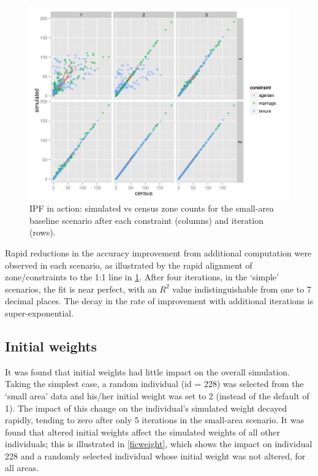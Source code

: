 \documentclass[a4paper,10pt]{article}
\begin{document}
\begin{figure}
 \begin{center}
  \includegraphics[width=12cm]{ipfinac}
 \end{center}
\caption{IPF in action: simulated vs census zone counts for the small-area baseline scenario after each constraint (columns) and iteration (rows).}
\label{fipfinac}
\end{figure}

Rapid reductions in the accuracy improvement from
additional computation were observed in each scenario, as illustrated
by the rapid alignment of zone/constraints to the 1:1 line in \cref{fipfinac}.
After four iterations, in the `simple' scenarios,
the fit is near perfect, with an $R^2$ value indistinguishable from one
to 7 decimal places. The decay in the rate of improvement with additional 
iterations is super-exponential. 

\subsection{Initial weights}
It was found that initial weights had little impact on the overall simulation. 
Taking the simplest case, a random individual (id = 228) was selected from the 
`small area' data and his/her initial weight was set to 2 
(instead of the default of 1). The impact of this change on the individual's 
simulated weight decayed rapidly, tending to zero after only 5 iterations in the small-area scenario. 
It was found that altered initial weights affect the simulated weights of all other individuals; 
this is illustrated in \cref{ficweight}, which shows the impact on individual 228 and a randomly selected 
individual whose initial weight was not altered, for all areas.
\end{document}
